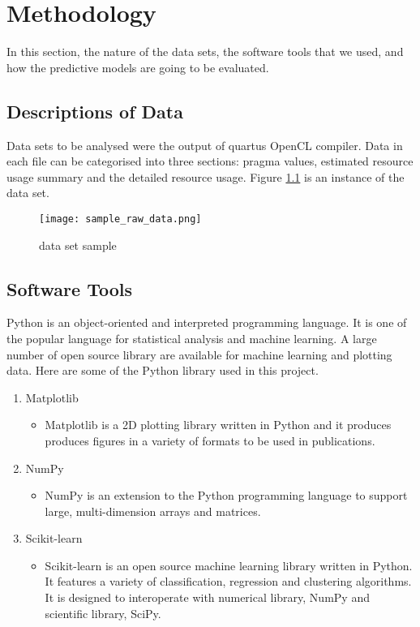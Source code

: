 \chapter{Methodology}

In this section, the nature of the data sets, the software tools that we used, and how the predictive models are going to be evaluated.

\section{Descriptions of Data}
Data sets to be analysed were the output of quartus OpenCL compiler. Data in each file can be categorised into three sections: pragma values, estimated resource usage summary and the detailed resource usage. Figure \ref{figure:sample_raw_data} is an instance of the data set.

\begin{figure}[h!]
\centering
\texttt{[image: sample\_raw\_data.png]}
\caption{data set sample}
\label{figure:sample_raw_data}
\end{figure}

\section{Software Tools}
Python\citep{Rossum:1995:PRM:869369} is an object-oriented and interpreted programming language. It is one of the popular language for statistical analysis and machine learning. A large number of open source library are available for machine learning and plotting data. Here are some of the Python library used in this project.

\begin{enumerate}
    \item Matplotlib
        \begin{itemize}
            \item Matplotlib \citep{Hunter:2007} is a 2D plotting library written in Python and it produces produces figures in a variety of formats to be used in publications.
        \end{itemize}
    \item NumPy
        \begin{itemize}
            \item NumPy \citep{developersnumpy} is an extension to the Python programming language to support large, multi-dimension arrays and matrices.
        \end{itemize}
    \item Scikit-learn
        \begin{itemize}
            \item Scikit-learn \citep{scikit-learn} is an open source machine learning library written in Python. It features a variety of classification, regression and clustering algorithms. It is designed to interoperate with numerical library, NumPy and scientific library, SciPy.
        \end{itemize}
\end{enumerate}

